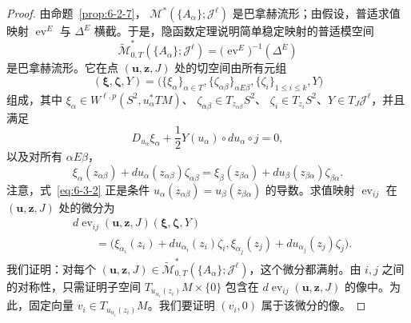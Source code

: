 \begin{proof}
由命题~\ref{prop:6-2-7}，
$\mathcal M^*(\{A_\alpha\};\mathcal J^\ell)$ 是巴拿赫流形；由假设，普适求值映射
$\operatorname{ev}^E$ 与 $\Delta^E$ 横截。于是，隐函数定理说明简单稳定映射的普适模空间
\[
  \widetilde{\mathcal M}^*_{0,T}(\{A_\alpha\};\mathcal J^\ell)
  =\bigl(\operatorname{ev}^E\bigr)^{-1}(\Delta^E)
\]
是巴拿赫流形。它在点 $(\mathbf u,\mathbf z,J)$ 处的切空间由所有元组
\[
  (\boldsymbol\xi,\boldsymbol\zeta,Y)
  =\bigl(\{\xi_\alpha\}_{\alpha\in T},
    \{\zeta_{\alpha\beta}\}_{\alpha E\beta},
    \{\zeta_i\}_{1\le i\le k},Y\bigr)
\]
组成，其中
$\xi_\alpha\in W^{\ell,p}(S^2,u_\alpha^*TM)$、
$\zeta_{\alpha\beta}\in T_{z_{\alpha\beta}}S^2$、
$\zeta_i\in T_{z_i}S^2$、$Y\in T_J\mathcal J^\ell$，并且满足
\begin{equation}\label{eq:6-3-1}
  D_{u_\alpha}\xi_\alpha
  +\frac12Y(u_\alpha)\circ du_\alpha\circ j=0,
\end{equation}
以及对所有 $\alpha E\beta$，
\begin{equation}\label{eq:6-3-2}
  \xi_\alpha(z_{\alpha\beta})
  +du_\alpha(z_{\alpha\beta})\zeta_{\alpha\beta}
  =\xi_\beta(z_{\beta\alpha})
  +du_\beta(z_{\beta\alpha})\zeta_{\beta\alpha}.
\end{equation}
注意，式~\eqref{eq:6-3-2} 正是条件
$u_\alpha(z_{\alpha\beta})=u_\beta(z_{\beta\alpha})$ 的导数。求值映射
$\operatorname{ev}_{ij}$ 在 $(\mathbf u,\mathbf z,J)$ 处的微分为
\begin{equation}\label{eq:6-3-3}
\begin{aligned}
  &d\operatorname{ev}_{ij}(\mathbf u,\mathbf z,J)
  (\boldsymbol\xi,\boldsymbol\zeta,Y)\\
  &\qquad=
  \bigl(\xi_{\alpha_i}(z_i)+du_{\alpha_i}(z_i)\zeta_i,
        \xi_{\alpha_j}(z_j)+du_{\alpha_j}(z_j)\zeta_j\bigr).
\end{aligned}
\end{equation}
我们证明：对每个
$(\mathbf u,\mathbf z,J)\in
\widetilde{\mathcal M}^*_{0,T}(\{A_\alpha\};\mathcal J^\ell)$，这个微分都满射。由 $i,j$
之间的对称性，只需证明子空间 $T_{u_{\alpha_i}(z_i)}M\times\{0\}$ 包含在
$d\operatorname{ev}_{ij}(\mathbf u,\mathbf z,J)$ 的像中。为此，固定向量
$v_i\in T_{u_{\alpha_i}(z_i)}M$。我们要证明 $(v_i,0)$ 属于该微分的像。


\end{proof}
